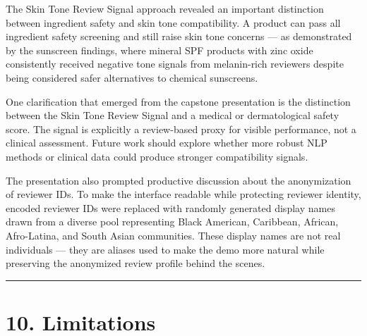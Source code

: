 \documentclass[
  letterpaper,
  DIV=11,
  numbers=noendperiod]{scrartcl}
\begin{document}
The Skin Tone Review Signal approach revealed an important distinction
between ingredient safety and skin tone compatibility. A product can
pass all ingredient safety screening and still raise skin tone concerns
--- as demonstrated by the sunscreen findings, where mineral SPF
products with zinc oxide consistently received negative tone signals
from melanin-rich reviewers despite being considered safer alternatives
to chemical sunscreens.

One clarification that emerged from the capstone presentation is the
distinction between the Skin Tone Review Signal and a medical or
dermatological safety score. The signal is explicitly a review-based
proxy for visible performance, not a clinical assessment. Future work
should explore whether more robust NLP methods or clinical data could
produce stronger compatibility signals.

The presentation also prompted productive discussion about the
anonymization of reviewer IDs. To make the interface readable while
protecting reviewer identity, encoded reviewer IDs were replaced with
randomly generated display names drawn from a diverse pool representing
Black American, Caribbean, African, Afro-Latina, and South Asian
communities. These display names are not real individuals --- they are
aliases used to make the demo more natural while preserving the
anonymized review profile behind the scenes.

\begin{center}\rule{0.5\linewidth}{0.5pt}\end{center}

\section{10. Limitations}\label{limitations}
\end{document}
